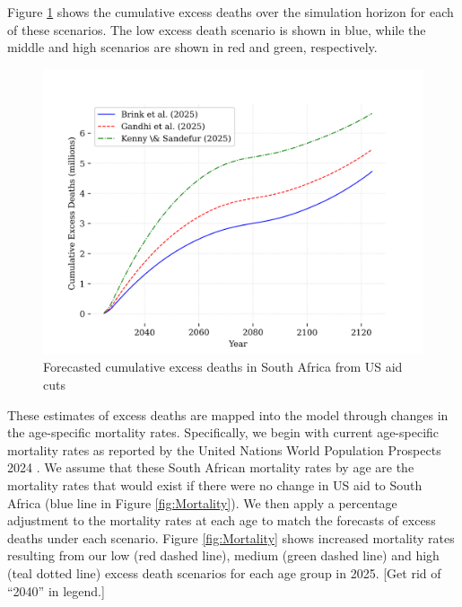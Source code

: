 \documentclass[letterpaper,12pt]{article}
\theoremstyle{definition}
\begin{document}
\begin{spacing}{1.5}
Figure \ref{fig:cumDeaths} shows the cumulative excess deaths over the simulation horizon for each of these scenarios. The low excess death scenario is shown in blue, while the middle and high scenarios are shown in red and green, respectively.

\begin{figure}[H]
    \caption{Forecasted cumulative excess deaths in South Africa from US aid cuts}
    \label{fig:cumDeaths}
    \centering
    \includegraphics[scale=0.75]{./tables_figures/cumulative_excess_deaths.png}
\end{figure}

These estimates of excess deaths are mapped into the model through changes in the age-specific mortality rates. Specifically, we begin with current age-specific mortality rates as reported by the United Nations World Population Prospects 2024 \citep{UN2024}. We assume that these South African mortality rates by age are the mortality rates that would exist if there were no change in US aid to South Africa (blue line in Figure \ref{fig:Mortality}). We then apply a percentage adjustment to the mortality rates at each age to match the forecasts of excess deaths under each scenario. Figure \ref{fig:Mortality} shows increased mortality rates resulting from our low (red dashed line), medium (green dashed line) and high (teal dotted line) excess death scenarios for each age group in 2025. [Get rid of ``2040'' in legend.]



\end{spacing}
\end{document}
